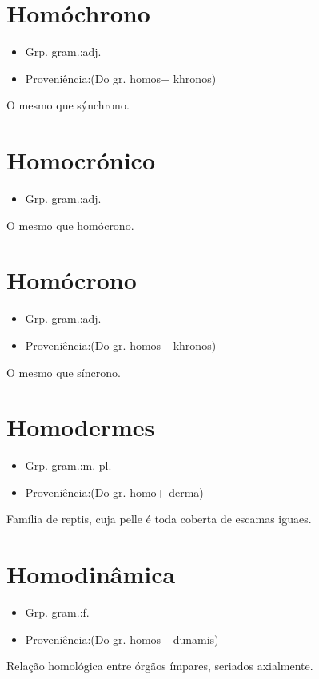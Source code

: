 \documentclass{article}
\begin{document}
\section{Homóchrono}
\begin{itemize}
\item {Grp. gram.:adj.}
\end{itemize}
\begin{itemize}
\item {Proveniência:(Do gr. \textunderscore homos\textunderscore  + \textunderscore khronos\textunderscore )}
\end{itemize}
O mesmo que \textunderscore sýnchrono\textunderscore .
\section{Homocrónico}
\begin{itemize}
\item {Grp. gram.:adj.}
\end{itemize}
O mesmo que \textunderscore homócrono\textunderscore .
\section{Homócrono}
\begin{itemize}
\item {Grp. gram.:adj.}
\end{itemize}
\begin{itemize}
\item {Proveniência:(Do gr. \textunderscore homos\textunderscore  + \textunderscore khronos\textunderscore )}
\end{itemize}
O mesmo que \textunderscore síncrono\textunderscore .
\section{Homodermes}
\begin{itemize}
\item {Grp. gram.:m. pl.}
\end{itemize}
\begin{itemize}
\item {Proveniência:(Do gr. \textunderscore homo\textunderscore  + \textunderscore derma\textunderscore )}
\end{itemize}
Família de reptis, cuja pelle é toda coberta de escamas iguaes.
\section{Homodinâmica}
\begin{itemize}
\item {Grp. gram.:f.}
\end{itemize}
\begin{itemize}
\item {Proveniência:(Do gr. \textunderscore homos\textunderscore  + \textunderscore dunamis\textunderscore )}
\end{itemize}
Relação homológica entre órgãos ímpares, seriados axialmente.
\end{document}
